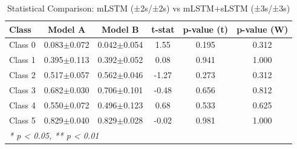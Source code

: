 \begin{table}[htbp]
\centering
\caption{Statistical Comparison: mLSTM (±2s/±2s) vs mLSTM+sLSTM (±3s/±3s)}
\label{tab:comparison_class_mlstm_±2s_±2s_vs_mlstmslstm_±3s_±3s}
\begin{tabular}{lccccc}
\toprule
\textbf{Class} & \textbf{Model A} & \textbf{Model B} & \textbf{t-stat} & \textbf{p-value (t)} & \textbf{p-value (W)} \\
\midrule
Class 0 & 0.083$\pm$0.072 & 0.042$\pm$0.054 & 1.55 & 0.195 & 0.312 \\
Class 1 & 0.395$\pm$0.113 & 0.392$\pm$0.052 & 0.08 & 0.941 & 1.000 \\
Class 2 & 0.517$\pm$0.057 & 0.562$\pm$0.046 & -1.27 & 0.273 & 0.312 \\
Class 3 & 0.682$\pm$0.030 & 0.706$\pm$0.101 & -0.48 & 0.656 & 0.812 \\
Class 4 & 0.550$\pm$0.072 & 0.496$\pm$0.123 & 0.68 & 0.533 & 0.625 \\
Class 5 & 0.829$\pm$0.040 & 0.829$\pm$0.028 & -0.02 & 0.981 & 1.000 \\
\bottomrule
\multicolumn{6}{l}{\textit{* p < 0.05, ** p < 0.01}} \\
\end{tabular}
\end{table}